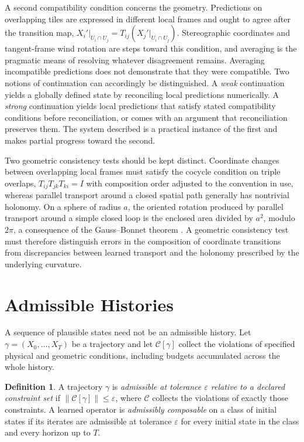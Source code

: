 \documentclass[11pt]{article}
\theoremstyle{definition}
\newtheorem{definition}{Definition}
\theoremstyle{remark}
\begin{document}
A second compatibility condition concerns the geometry. Predictions on overlapping tiles are expressed in different local frames and ought to agree after the transition map, $X_i'|_{U_i\cap U_j} = T_{ij}(X_j'|_{U_i\cap U_j})$. Stereographic coordinates and tangent-frame wind rotation are steps toward this condition, and averaging is the pragmatic means of resolving whatever disagreement remains. Averaging incompatible predictions does not demonstrate that they were compatible. Two notions of continuation can accordingly be distinguished. A \emph{weak} continuation yields a globally defined state by reconciling local predictions numerically. A \emph{strong} continuation yields local predictions that satisfy stated compatibility conditions before reconciliation, or comes with an argument that reconciliation preserves them. The system described is a practical instance of the first and makes partial progress toward the second.

Two geometric consistency tests should be kept distinct. Coordinate changes between overlapping local frames must satisfy the cocycle condition on triple overlaps, $T_{ij}T_{jk}T_{ki}=I$ with composition order adjusted to the convention in use, whereas parallel transport around a closed spatial path generally has nontrivial holonomy. On a sphere of radius $a$, the oriented rotation produced by parallel transport around a simple closed loop is the enclosed area divided by $a^2$, modulo $2\pi$, a consequence of the Gauss--Bonnet theorem \cite{docarmo1976differential}. A geometric consistency test must therefore distinguish errors in the composition of coordinate transitions from discrepancies between learned transport and the holonomy prescribed by the underlying curvature.

\section{Admissible Histories}

A sequence of plausible states need not be an admissible history. Let $\gamma = (X_0,\dots,X_T)$ be a trajectory and let $\mathcal C[\gamma]$ collect the violations of specified physical and geometric conditions, including budgets accumulated across the whole history.

\begin{definition}
A trajectory $\gamma$ is \emph{admissible at tolerance $\varepsilon$ relative to a declared constraint set} if $\|\mathcal C[\gamma]\| \le \varepsilon$, where $\mathcal C$ collects the violations of exactly those constraints. A learned operator is \emph{admissibly composable} on a class of initial states if its iterates are admissible at tolerance $\varepsilon$ for every initial state in the class and every horizon up to $T$.
\end{definition}
\end{document}
